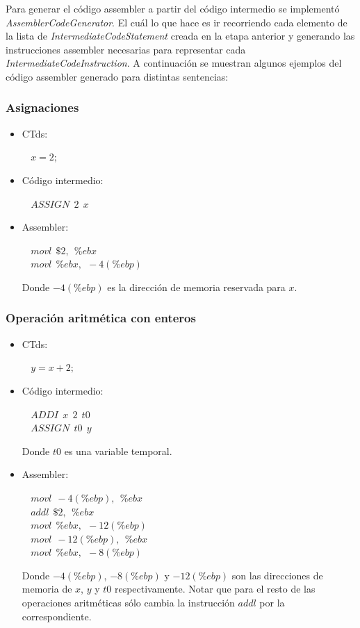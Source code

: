 \documentclass[11pt,a4paper]{article}
\begin{document}
Para generar el código assembler a partir del código intermedio se implementó \textit{AssemblerCodeGenerator}. El cuál lo que hace es ir recorriendo cada elemento  de la lista de \textit{IntermediateCodeStatement} creada en la etapa anterior y generando las instrucciones assembler necesarias para representar cada \textit{IntermediateCodeInstruction}. A continuación se muestran algunos ejemplos del código assembler generado para distintas sentencias:
\subsubsection{Asignaciones}
\begin{itemize}
	\item CTds:
		\begin{flushleft}
			$\ \ \ \ x = 2 ;$
		\end{flushleft}
	\item Código intermedio:
		\begin{flushleft}
			$\ \ \ \ ASSIGN \ \ 2 \ \ x$
		\end{flushleft}
	\item Assembler:
		\begin{flushleft}
			$\ \ \ \ movl \ \ \$2, \ \ \%ebx $ \\
			$\ \ \ \ movl \ \ \%ebx, \ \ -4(\%ebp)$	
		\end{flushleft}
		Donde $-4(\%ebp)$ es la dirección de memoria reservada para $x$.
\end{itemize}
\subsubsection{Operación aritmética con enteros}
\begin{itemize}
	\item CTds:
		\begin{flushleft}
			$\ \ \ \ y = x + 2 ;$
		\end{flushleft}
	\item Código intermedio:
		\begin{flushleft}
			$\ \ \ \ ADDI \ \ x \ \ 2 \ \ t0$ \\
			$\ \ \ \ ASSIGN \ \ t0 \ \ y$
		\end{flushleft}
		Donde $t0$ es una variable temporal.
	\item Assembler:
		\begin{flushleft}
			$\ \ \ \ movl \ \ -4(\%ebp), \ \ \%ebx $ \\
			$\ \ \ \ addl \ \ \$2, \ \ \%ebx$ \\
			$\ \ \ \ movl \ \ \%ebx, \ \ -12(\%ebp)$ \\
			$\ \ \ \ movl \ \ -12(\%ebp), \ \ \%ebx$ \\
			$\ \ \ \ movl \ \ \%ebx, \ \ -8(\%ebp)$	
		\end{flushleft}
		Donde $-4(\%ebp)$, $-8(\%ebp)$ y $-12(\%ebp)$ son las direcciones de memoria de $x$, $y$ y $t0$ respectivamente. Notar que para el resto de las operaciones aritméticas sólo cambia la instrucción $addl$ por la correspondiente.
\end{itemize}
\end{document}
